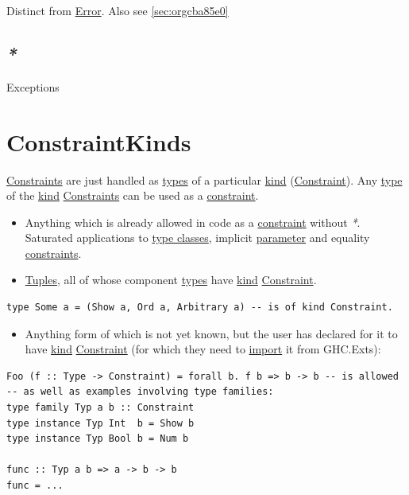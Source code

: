\documentclass[a4paper,14pt,oneside]{book}
\begin{document}
Distinct from \hyperref[orga551013]{Error}. Also see \ref{sec:orgcba85e0}

\section{\emph{*}}
\label{sec:org1ef268d}

\label{org6b1ed23}Exceptions

\chapter{\label{org579ff3c}ConstraintKinds}
\label{sec:orgfd1be18}
\hyperref[org1d85cbd]{Constraints} are just handled as \hyperref[orgc4edbaa]{types} of a particular \hyperref[org6d2ee64]{kind} (\hyperref[org933ba21]{Constraint}).
Any \hyperref[orgbdf1a7c]{type} of the \hyperref[org6d2ee64]{kind} \hyperref[org1d85cbd]{Constraints} can be used as a \hyperref[org933ba21]{constraint}.
\begin{itemize}
\item Anything which is already allowed in code as a \hyperref[org933ba21]{constraint} without \emph{*}. Saturated applications to \hyperref[orgb02a5d5]{type classes}, implicit \hyperref[org7bfb0e1]{parameter} and equality \hyperref[org1d85cbd]{constraints}.
\item \hyperref[org27a01f9]{Tuples}, all of whose component \hyperref[orgc4edbaa]{types} have \hyperref[org6d2ee64]{kind} \hyperref[org933ba21]{Constraint}.
\end{itemize}
\begin{verbatim}
type Some a = (Show a, Ord a, Arbitrary a) -- is of kind Constraint.
\end{verbatim}
\begin{itemize}
\item Anything form of which is not yet known, but the user has declared for it to have \hyperref[org6d2ee64]{kind} \hyperref[org933ba21]{Constraint} (for which they need to \hyperref[org29518dd]{import} it from GHC.Exts):
\end{itemize}
\begin{verbatim}
Foo (f :: Type -> Constraint) = forall b. f b => b -> b -- is allowed
-- as well as examples involving type families:
type family Typ a b :: Constraint
type instance Typ Int  b = Show b
type instance Typ Bool b = Num b

func :: Typ a b => a -> b -> b
func = ...
\end{verbatim}
\end{document}
